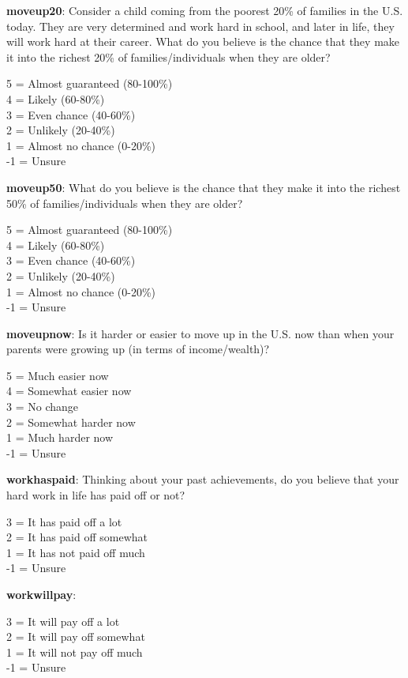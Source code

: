 \documentclass[11pt, headsepline]{article}
\begin{document}
\textbf{moveup20}: Consider a child coming from the poorest 20\% of families in the U.S. today. They are very determined and work hard in school, and later in life, they will work hard at their career. What do you believe is the chance that they make it into the richest 20\% of families/individuals when they are older?

5 = Almost guaranteed (80-100\%) \\
4 = Likely (60-80\%) \\
3 = Even chance (40-60\%) \\
2 = Unlikely (20-40\%) \\
1 = Almost no chance (0-20\%) \\
-1 = Unsure

\textbf{moveup50}: What do you believe is the chance that they make it into the richest 50\% of families/individuals when they are older?

5 = Almost guaranteed (80-100\%) \\
4 = Likely (60-80\%) \\
3 = Even chance (40-60\%) \\
2 = Unlikely (20-40\%) \\
1 = Almost no chance (0-20\%) \\
-1 = Unsure

\textbf{moveupnow}: Is it harder or easier to move up in the U.S. now than when your parents were growing up (in terms of income/wealth)?

5 = Much easier now \\
4 = Somewhat easier now \\
3 = No change \\
2 = Somewhat harder now \\
1 = Much harder now \\
-1 = Unsure

\textbf{workhaspaid}: Thinking about your past achievements, do you believe that your hard work in life has paid off or not?

3 = It has paid off a lot \\
2 = It has paid off somewhat \\
1 = It has not paid off much \\
-1 = Unsure

\textbf{workwillpay}:

3 = It will pay off a lot \\
2 = It will pay off somewhat \\
1 = It will not pay off much \\
-1 = Unsure 
\end{document}
